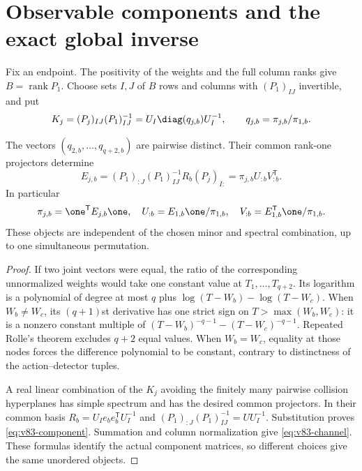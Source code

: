 \section{Observable components and the exact global inverse}
\label{sec:v83-components}

Fix an endpoint. The positivity of the weights and the full column
ranks give $B=\operatorname{rank}P_1$. Choose sets $I,J$ of $B$ rows
and columns with $(P_1)_{IJ}$ invertible, and put
\begin{equation}\label{eq:v83-operators}
 K_j=(P_j)_{IJ}(P_1)_{IJ}^{-1}
     =U_I\diag(q_{j,b})U_I^{-1},\qquad
 q_{j,b}=\pi_{j,b}/\pi_{1,b}.
\end{equation}

\begin{lemma}
\label{lem:v83-components}
The vectors $(q_{2,b},\ldots,q_{q+2,b})$ are pairwise distinct.
Their common rank-one projectors determine
\begin{equation}\label{eq:v83-component}
 E_{j,b}=(P_1)_{:J}(P_1)_{IJ}^{-1}R_b(P_j)_{I:}
         =\pi_{j,b}U_{:b}V_{:b}^{\mathsf T}.
\end{equation}
In particular
\begin{equation}\label{eq:v83-channel}
 \pi_{j,b}=\one^{\mathsf T}E_{j,b}\one,\quad
 U_{:b}=E_{1,b}\one/\pi_{1,b},\quad
 V_{:b}=E_{1,b}^{\mathsf T}\one/\pi_{1,b}.
\end{equation}
These objects are independent of the chosen minor and spectral
combination, up to one simultaneous permutation.
\end{lemma}
\begin{proof}
If two joint vectors were equal, the ratio of the corresponding
unnormalized weights would take one constant value at
$T_1,\ldots,T_{q+2}$. Its logarithm is a polynomial of degree at most
$q$ plus $\log(T-W_b)-\log(T-W_c)$. When $W_b\ne W_c$, its
$(q+1)$st derivative has one strict sign on $T>\max(W_b,W_c)$:
it is a nonzero constant multiple of
$(T-W_b)^{-q-1}-(T-W_c)^{-q-1}$. Repeated Rolle's theorem excludes
$q+2$ equal values. When $W_b=W_c$, equality at those nodes forces
the difference polynomial to be constant, contrary to distinctness
of the action--detector tuples.

A real linear combination of the $K_j$ avoiding the finitely many
pairwise collision hyperplanes has simple spectrum and has the desired
common projectors. In their common basis
$R_b=U_I e_be_b^{\mathsf T}U_I^{-1}$ and
$(P_1)_{:J}(P_1)_{IJ}^{-1}=UU_I^{-1}$. Substitution proves
\eqref{eq:v83-component}. Summation and column normalization give
\eqref{eq:v83-channel}. These formulas identify the actual component
matrices, so different choices give the same unordered objects.
\end{proof}

